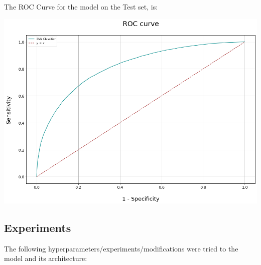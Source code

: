 \documentclass[12pt]{report}
\begin{document}
\noindent The ROC Curve for the model on the Test set, is:
\bigskip
\bigskip

\hspace*{-2.0cm}
\includegraphics[scale=0.45]{roc1.png}
\smallskip


\clearpage
\subsection*{Experiments}
The following hyperparameters/experiments/modifications were tried to the model and its
architecture:
\smallskip
\end{document}
